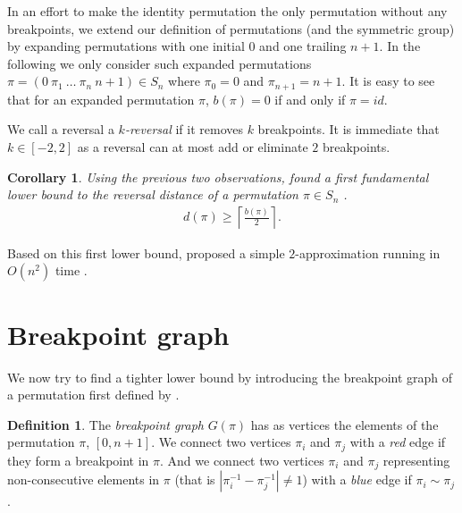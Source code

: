 \documentclass[11pt,DIV=11]{scrartcl}
\newtheorem{corollary}{Corollary}[theorem]
\theoremstyle{definition}
\newtheorem{definition}[theorem]{Definition}
\theoremstyle{remark}
\begin{document}
In an effort to make the identity permutation the only permutation without any breakpoints, we extend our definition of permutations (and the symmetric group) by expanding permutations with one initial $0$ and one trailing $n+1$. In the following we only consider such expanded permutations $\pi = (0\ \pi_1\ \dots\ \pi_n\ n+1) \in S_n$ where $\pi_0 = 0$ and $\pi_{n+1} = n+1$. It is easy to see that for an expanded permutation $\pi$, $b(\pi) = 0$ if and only if $\pi = id$.

We call a reversal a \textit{$k$-reversal} if it removes $k$ breakpoints. It is immediate that $k \in [-2,2]$ as a reversal can at most add or eliminate $2$ breakpoints.

\begin{corollary}
Using the previous two observations, \citeauthor*{Kececioglu1995} found a first fundamental lower bound to the reversal distance of a permutation $\pi \in S_n$ \cite{Kececioglu1995}.
\begin{align*}
    d(\pi) \geq \left\lceil \frac{b(\pi)}{2} \right\rceil.
\end{align*}
\end{corollary}

Based on this first lower bound, \citeauthor*{Kececioglu1995} proposed a simple $2$-approximation running in $O(n^2)$ time \cite{Kececioglu1995}.

\section{Breakpoint graph}
\label{sec:breakpoint_graph}

We now try to find a tighter lower bound by introducing the breakpoint graph of a permutation first defined by \citeauthor*{Bafna1996}.

\begin{definition}
The \textit{breakpoint graph} $G(\pi)$ has as vertices the elements of the permutation $\pi$, $[0, n+1]$. We connect two vertices $\pi_i$ and $\pi_j$ with a \textit{red} edge if they form a breakpoint in $\pi$. And we connect two vertices $\pi_i$ and $\pi_j$ representing non-consecutive elements in $\pi$ (that is $|\pi_i^{-1} - \pi_j^{-1}| \neq 1$) with a \textit{blue} edge if $\pi_i \sim \pi_j$.
\end{definition}
\end{document}
